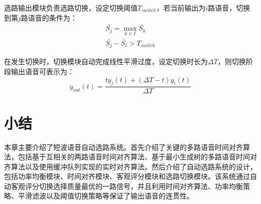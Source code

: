 选路输出模块负责选路切换，设定切换阈值$T_{switch}$，若当前输出为$i$路语音，切换到第$j$路语音的条件为：
\begin{equation}
\begin{array}{l}
\bar{S_j} = \max\limits_{k \in I} \bar{S_k} \\
\bar{S_j} - \bar{S_i} > T_{switch}
\end{array}
\end{equation}

在发生切换时，切换模块自动完成线性平滑过度，设定切换时长为$\Delta T$，则切换阶段输出语音可表示为：
\begin{equation}
y_{out}(t) = \frac{ty_j(t)+(\Delta T-t)y_i(t)}{\Delta T}
\end{equation}

\section{小结}

本章主要介绍了短波语音自动选路系统。首先介绍了关键的多路语音时间对齐算法，包括基于互相关的两路语音时间对齐算法、基于最小生成树的多路语音时间对齐算法以及使用缓冲队列实现的实时对齐算法。然后介绍了自动选路系统的设计，包括功率均衡模块、时间对齐模块、客观评分模块和选路切换模块。该系统通过自动客观评分切换选择质量最优的一路信号，并且利用时间对齐算法、功率均衡策略、平滑滤波以及阈值切换策略等保证了输出语音的连贯性。
